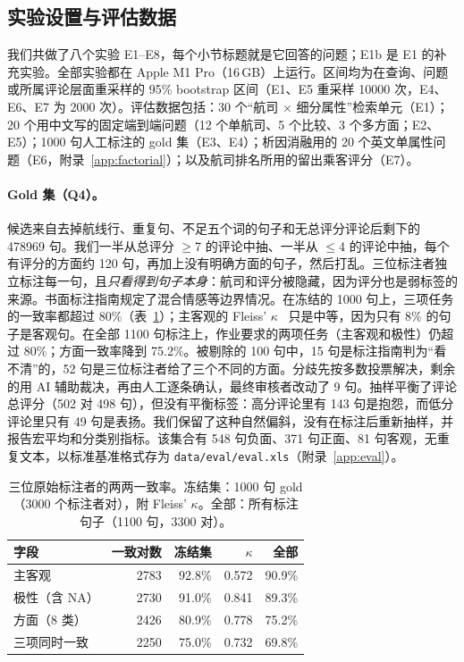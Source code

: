 \documentclass[10pt,twocolumn,a4paper]{article}
\begin{document}
\subsection{实验设置与评估数据}
\label{sec:data}

我们共做了八个实验 E1--E8，每个小节标题就是它回答的问题；E1b 是 E1 的补充实验。全部实验都在 Apple M1 Pro（16\,GB）上运行。区间均为在查询、问题或所属评论层面重采样的 95\% bootstrap 区间（E1、E5 重采样 \num{10000} 次，E4、E6、E7 为 \num{2000} 次）。评估数据包括：30 个“航司 $\times$ 细分属性”检索单元（E1）；20 个用中文写的固定端到端问题（12 个单航司、5 个比较、3 个多方面；E2、E5）；\num{1000} 句人工标注的 gold 集（E3、E4）；析因消融用的 20 个英文单属性问题（E6，附录~\ref{app:factorial}）；以及航司排名所用的留出乘客评分（E7）。

\paragraph{Gold 集（Q4）。}候选来自去掉航线行、重复句、不足五个词的句子和无总评分评论后剩下的 \num{478969} 句。我们一半从总评分 $\ge$7 的评论中抽、一半从 $\le$4 的评论中抽，每个有评分的方面约 120 句，再加上没有明确方面的句子，然后打乱。三位标注者独立标注每一句，且\emph{只看得到句子本身}：航司和评分被隐藏，因为评分也是弱标签的来源。书面标注指南规定了混合情感等边界情况。在冻结的 \num{1000} 句上，三项任务的一致率都超过 80\%（表~\ref{tab:agree}）；主客观的 Fleiss' $\kappa$~\cite{fleiss} 只是中等，因为只有 8\% 的句子是客观句。在全部 \num{1100} 句标注上，作业要求的两项任务（主客观和极性）仍超过 80\%；方面一致率降到 75.2\%。被剔除的 100 句中，15 句是标注指南判为“看不清”的，52 句是三位标注者给了三个不同的方面。分歧先按多数投票解决，剩余的用 AI 辅助裁决，再由人工逐条确认，最终审核者改动了 9 句。抽样平衡了评论总评分（502 对 498 句），但没有平衡标签：高分评论里有 143 句是抱怨，而低分评论里只有 49 句是表扬。我们保留了这种自然偏斜，没有在标注后重新抽样，并报告宏平均和分类别指标。该集合有 548 句负面、371 句正面、81 句客观，无重复文本，以标准基准格式存为 \nolinkurl{data/eval/eval.xls}（附录~\ref{app:eval}）。

\begin{table}[t]
\centering\small
\caption{三位原始标注者的两两一致率。冻结集：\num{1000} 句 gold（\num{3000} 个标注者对），附 Fleiss' $\kappa$。全部：所有标注句子（\num{1100} 句，\num{3300} 对）。}
\label{tab:agree}
\setlength{\tabcolsep}{4pt}
\begin{tabular}{@{}lrrrr@{}}
\toprule
\textbf{字段} & \textbf{一致对数} & \textbf{冻结集} & \textbf{$\kappa$} & \textbf{全部} \\
\midrule
主客观 & \num{2783} & 92.8\% & 0.572 & 90.9\% \\
极性（含 NA） & \num{2730} & 91.0\% & 0.841 & 89.3\% \\
方面（8 类） & \num{2426} & 80.9\% & 0.778 & 75.2\% \\
三项同时一致 & \num{2250} & 75.0\% & 0.732 & 69.8\% \\
\bottomrule
\end{tabular}
\end{table}
\end{document}
